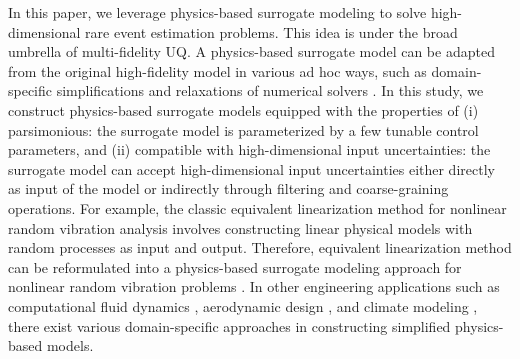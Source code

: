 \documentclass[number,preprint,3p]{elsarticle}
\newcommand{\1}[2]{\mathbb{I}_{#1}\left(#2\right)}
\begin{document}
	In this paper, we leverage physics-based surrogate modeling to solve high-dimensional rare event estimation problems. This idea is under the broad umbrella of multi-fidelity UQ. %
 A physics-based surrogate model can be adapted from the original high-fidelity model in various ad hoc ways, such as domain-specific simplifications \cite{peterson2018overview,han2013improving,held2005gap} and relaxations of numerical solvers \cite{peherstorfer2018survey}. In this study, we construct physics-based surrogate models equipped with the properties of (i) {parsimonious}: the surrogate model is parameterized by a few tunable control parameters, and (ii) {compatible with high-dimensional input uncertainties}: the surrogate model can accept high-dimensional input uncertainties either directly as input of the model or indirectly through filtering and coarse-graining operations. For example, the classic equivalent linearization method \cite{crandall2006half,elishakoff2017sixty} for nonlinear random vibration analysis involves constructing linear physical models with random processes as input and output. Therefore, equivalent linearization method can be reformulated into a physics-based surrogate modeling approach for nonlinear random vibration problems \cite{wang2022optimized}. In other engineering applications such as computational fluid dynamics \cite{peterson2018overview}, aerodynamic design \cite{han2013improving}, and climate modeling \cite{held2005gap}, there exist various domain-specific approaches in constructing simplified physics-based models. %
	
\end{document}
